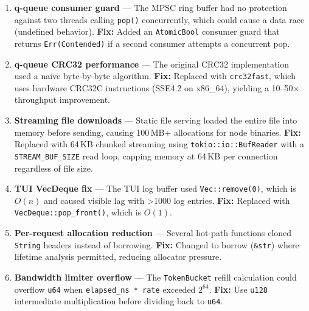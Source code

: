 \documentclass[a4paper, 11pt]{article}
\begin{document}
\begin{enumerate}
  \item \textbf{q-queue consumer guard} --- The MPSC ring buffer had no
        protection against two threads calling \texttt{pop()}
        concurrently, which could cause a data race (undefined behavior).
        \textbf{Fix:} Added an \texttt{AtomicBool} consumer guard that
        returns \texttt{Err(Contended)} if a second consumer attempts a
        concurrent pop.

  \item \textbf{q-queue CRC32 performance} --- The original CRC32
        implementation used a naive byte-by-byte algorithm.
        \textbf{Fix:} Replaced with \texttt{crc32fast}, which uses
        hardware CRC32C instructions (SSE4.2 on x86\_64),
        yielding a 10--50$\times$ throughput improvement.

  \item \textbf{Streaming file downloads} --- Static file serving loaded
        the entire file into memory before sending, causing 100\,MB+
        allocations for node binaries.
        \textbf{Fix:} Replaced with 64\,KB chunked streaming using
        \texttt{tokio::io::BufReader} with a \texttt{STREAM\_BUF\_SIZE}
        read loop, capping memory at 64\,KB per connection regardless
        of file size.

  \item \textbf{TUI VecDeque fix} --- The TUI log buffer used
        \texttt{Vec::remove(0)}, which is $O(n)$ and caused visible
        lag with >1000 log entries.
        \textbf{Fix:} Replaced with \texttt{VecDeque::pop\_front()},
        which is $O(1)$.

  \item \textbf{Per-request allocation reduction} --- Several hot-path
        functions cloned \texttt{String} headers instead of borrowing.
        \textbf{Fix:} Changed to borrow (\texttt{\&str}) where
        lifetime analysis permitted, reducing allocator pressure.

  \item \textbf{Bandwidth limiter overflow} --- The \texttt{TokenBucket}
        refill calculation could overflow \texttt{u64} when
        \texttt{elapsed\_ns * rate} exceeded $2^{64}$.
        \textbf{Fix:} Use \texttt{u128} intermediate multiplication
        before dividing back to \texttt{u64}.
\end{enumerate}


\end{document}
